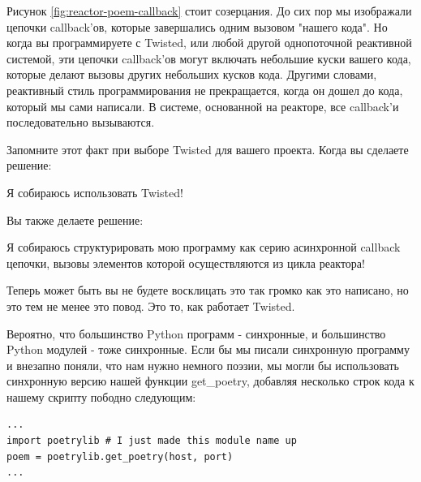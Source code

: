 Рисунок \ref{fig:reactor-poem-callback} стоит созерцания. 
До сих пор мы изображали цепочки callback'ов, которые 
завершались одним вызовом "нашего кода". Но когда вы 
программируете с Twisted, или любой другой однопоточной  
реактивной системой, эти цепочки callback'ов могут включать 
небольшие куски вашего кода, которые делают вызовы других 
небольших кусков кода. Другими словами, реактивный 
стиль программирования не прекращается, когда он дошел до 
кода, который мы сами написали. В системе, основанной на 
реакторе, все callback'и последовательно 
вызываются.

Запомните этот факт при выборе Twisted для вашего проекта. 
Когда вы сделаете решение:


\hspace{10mm}
Я собираюсь использовать Twisted!

Вы также делаете решение:


\hspace{10mm}
Я собираюсь структурировать мою программу как серию 
асинхронной callback цепочки, вызовы элементов которой 
осуществляются из цикла реактора!


Теперь может быть вы не будете восклицать это так громко как это написано, 
но это тем не менее это повод. Это то, как работает Twisted.



Вероятно, что большинство Python программ - синхронные, и 
большинство Python модулей - тоже синхронные. Если бы мы 
писали синхронную программу и внезапно поняли, что нам 
нужно немного поэзии, мы могли бы использовать 
синхронную версию нашей функции get\_poetry, добавляя 
несколько строк кода к нашему скрипту пободно следующим:


\begin{scriptsize}\begin{verbatim}
...
import poetrylib # I just made this module name up
poem = poetrylib.get_poetry(host, port)
...
\end{verbatim}\end{scriptsize}

